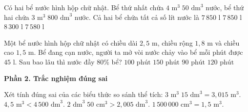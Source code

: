 \begin{ex} %
Có hai bể nước hình hộp chữ nhật. Bể thứ nhất chứa $4\text{ m}^3\; 50\text{ dm}^3$ nước, bể thứ hai chứa $3\text{ m}^3\; 800\text{ dm}^3$ nước. Cả hai bể chứa tất cả số lít nước là
\choice
{\True $7\,850\text{ l}$}
{$7\,850\text{ l}$}
{$8\,300\text{ l}$}
{$7\,580\text{ l}$}
\end{ex}

\begin{ex} %
Một bể nước hình hộp chữ nhật có chiều dài $2{,}5\text{ m}$, chiều rộng $1{,}8\text{ m}$ và chiều cao $1{,}5\text{ m}$. Bể đang cạn nước, người ta mở vòi nước chảy vào bể mỗi phút được $45\text{ l}$. Sau bao lâu thì nước đầy $80\%$ bể?
\choice
{$100\text{ phút}$}
{$150\text{ phút}$}
{$90\text{ phút}$}
{\True $120\text{ phút}$}
\end{ex}

\textbf{Phần 2. Trắc nghiệm đúng sai}

\begin{ex} %
Xét tính đúng sai của các biểu thức so sánh thể tích:
\choiceTF
{\True $3\text{ m}^3\; 15\text{ dm}^3 = 3{,}015\text{ m}^3$.}
{$4{,}5\text{ m}^3 < 4\,500\text{ dm}^3$.}
{\True $2\text{ dm}^3\; 50\text{ cm}^3 > 2{,}005\text{ dm}^3$.}
{\True $1\,500\,000\text{ cm}^3 = 1{,}5\text{ m}^3$.}
\end{ex}

